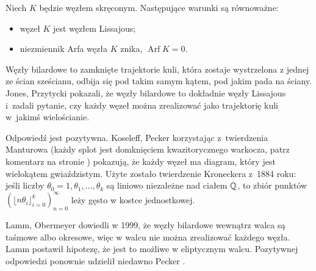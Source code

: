\begin{proposition}
%
%
    Niech $K$ będzie węzłem skręconym.
    Następujące warunki są równoważne:
    \begin{itemize}
        \item węzeł $K$ jest węzłem Lissajous;
        \item niezmiennik Arfa węzła $K$ znika, $\operatorname{Arf} K = 0$.
    \end{itemize}
\end{proposition}

Węzły bilardowe to zamknięte trajektorie kuli, która zostaje wystrzelona z jednej ze ścian sześcianu, odbija się pod takim samym kątem, pod jakim pada na ściany.
%
Jones, Przytycki \cite{jones1998} pokazali, że węzły bilardowe to dokładnie węzły Lissajous i~zadali pytanie, czy każdy węzeł można zrealizować jako trajektorię kuli w~jakimś wielościanie.
%
%

Odpowiedź jest pozytywna.
Koseleff, Pecker \cite{koseleff2014} korzystając z~twierdzenia Manturowa
%
%
%
(każdy splot jest domknięciem kwazitorycznego warkocza, patrz komentarz na stronie \pageref{thm:alexander})
pokazują, że każdy węzeł ma diagram, który jest wielokątem gwiaździstym.
Użyte zostało twierdzenie Kroneckera z~1884 roku: jeśli liczby $\theta_0 = 1, \theta_1, \ldots, \theta_k$ są liniowo niezależne nad ciałem $\mathbb Q$, to zbiór punktów $(\lfloor n\theta_i \rfloor_{i=0}^k)_{n=0}^\infty$ leży gęsto w kostce jednostkowej.

Lamm, Obermeyer \cite{obermeyer1999} dowiedli w 1999, że węzły bilardowe wewnątrz walca są taśmowe albo okresowe, więc w walcu nie można zrealizować każdego węzła.
%
%
%
%
Lamm postawił hipotezę, że jest to możliwe w eliptycznym walcu.
Pozytywnej odpowiedzi ponownie udzielił niedawno Pecker \cite{pecker2012}.
%




